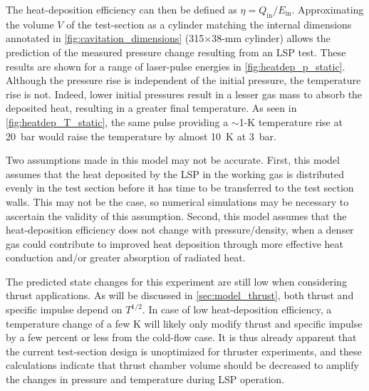                 The heat-deposition efficiency can then be defined as $\eta = Q_\mathrm{in}/E_\mathrm{in}$. Approximating the volume $V$ of the test-section as a cylinder matching the internal dimensions annotated in \autoref{fig:cavitation_dimensions} (315$\times$38-\unit{mm} cylinder) allows the prediction of the measured pressure change resulting from an LSP test. These results are shown for a range of laser-pulse energies in \autoref{fig:heatdep_p_static}. Although the pressure rise is independent of the initial pressure, the temperature rise is not. Indeed, lower initial pressures result in a lesser gas mass to absorb the deposited heat, resulting in a greater final temperature. As seen in \autoref{fig:heatdep_T_static}, the same pulse providing a $\sim$1-K temperature rise at \qty{20}{bar} would raise the temperature by almost \qty{10}{K} at \qty{3}{bar}.

                Two assumptions made in this model may not be accurate. First, this model assumes that the heat deposited by the LSP in the working gas is distributed evenly in the test section before it has time to be transferred to the test section walls. This may not be the case, so numerical simulations may be necessary to ascertain the validity of this assumption. Second, this model assumes that the heat-deposition efficiency does not change with pressure/density, when a denser gas could contribute to improved heat deposition through more effective heat conduction and/or greater absorption of radiated heat.

                The predicted state changes for this experiment are still low when considering thrust applications. As will be discussed in \autoref{sec:model_thrust}, both thrust and specific impulse depend on $T^{1/2}$. In case of low heat-deposition efficiency, a temperature change of a few K will likely only modify thrust and specific impulse by a few percent or less from the cold-flow case. It is thus already apparent that the current test-section design is unoptimized for thruster experiments, and these calculations indicate that thrust chamber volume should be decreased to amplify the changes in pressure and temperature during LSP operation.

